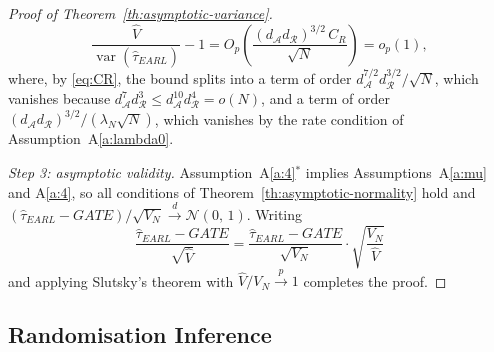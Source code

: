 \documentclass[sigconf]{acmart}
\DeclareMathOperator{\var}{var}
\begin{document}
\begin{proof}[Proof of Theorem~\ref{th:asymptotic-variance}]
    \begin{equation*}
        \frac{\hat V}{\var(\hat\tau^{\phantom{1}}_{EARL})} - 1 = O_p\left(\frac{(d_{\mathcal A}d_{\mathcal R})^{3/2}\,C_R}{\sqrt N}\right) = o_p(1),
    \end{equation*}
    where, by \eqref{eq:CR}, the bound splits into a term of order $d^{7/2}_{\mathcal A}d^{3/2}_{\mathcal R}/\sqrt N$, which vanishes because $d^{7}_{\mathcal A}d^{3}_{\mathcal R}\le d^{10}_{\mathcal A}d^{4}_{\mathcal R} = o(N)$, and a term of order $(d_{\mathcal A}d_{\mathcal R})^{3/2}/(\lambda_N\sqrt N)$, which vanishes by the rate condition of Assumption~A\ref{a:lambda0}.

    \emph{Step 3: asymptotic validity.} Assumption~A\ref{a:4}$^*$ implies Assumptions~A\ref{a:mu} and A\ref{a:4}, so all conditions of Theorem~\ref{th:asymptotic-normality} hold and $(\hat\tau_{EARL}-GATE)/\sqrt{V_N}\stackrel{d}{\to}\mathcal N(0,\,1)$. Writing
    \begin{equation*}
        \frac{\hat\tau^{\phantom{1}}_{EARL} - GATE}{\sqrt{\hat V}} = \frac{\hat\tau^{\phantom{1}}_{EARL} - GATE}{\sqrt{V_N}}\cdot\sqrt{\frac{V_N}{\hat V}}
    \end{equation*}
    and applying Slutsky's theorem with $\hat V/V_N\stackrel{p}{\to}1$ completes the proof.
\end{proof}

\subsection{Randomisation Inference}\label{app:ri}
\end{document}
